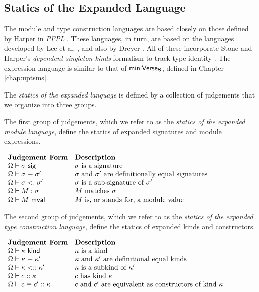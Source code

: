 \subsection{Statics of the Expanded Language}
The module and type construction languages are based closely on those defined by Harper in \emph{PFPL} \cite{pfpl}. These languages, in turn, are based on the languages developed by Lee et al. \cite{conf/popl/LeeCH07}, and also by Dreyer \cite{dreyer2005understanding}. All of these incorporate Stone and Harper's \emph{dependent singleton kinds} formalism to track type identity \cite{stone2006extensional}. The expression language is similar to that of $\mathsf{miniVerse}_\textbf{S}$, defined in Chapter \ref{chap:uptsms}.

The \emph{statics of the expanded language} is defined by a collection of judgements that we organize into three groups. 

The first group of judgements, which we refer to as the \emph{statics of the expanded module language}, define the statics of expanded signatures and module expressions.

\vspace{5px}
$\begin{array}{ll}
\textbf{Judgement Form} & \textbf{Description}\\
\Omega \vdash \sigma~\mathsf{sig} & \text{$\sigma$ is a signature }\\
\Omega \vdash \sigma \equiv \sigma' & \text{$\sigma$ and $\sigma'$ are definitionally equal signatures}\\
\Omega \vdash \sigma <: \sigma' & \text{$\sigma$ is a sub-signature of $\sigma'$}\\
\Omega \vdash M : \sigma & \text{$M$ matches $\sigma$}\\
\Omega \vdash M~\mathsf{mval} & \text{$M$ is, or stands for, a module value}
\end{array}$
\vspace{5px}

The second group of judgements, which we refer to as the \emph{statics of the expanded type construction language}, define the statics of expanded kinds and constructors.

\vspace{5px}
$\begin{array}{ll}
\textbf{Judgement Form} & \textbf{Description}\\
\Omega \vdash \kappa~\mathsf{kind} & \text{$\kappa$ is a kind}\\
\Omega \vdash \kappa \equiv \kappa' & \text{$\kappa$ and $\kappa'$ are definitional equal kinds}\\
\Omega \vdash \kappa <:: \kappa' & \text{$\kappa$ is a subkind of $\kappa'$}\\
\Omega \vdash c :: \kappa & \text{$c$ has kind $\kappa$}\\
\Omega \vdash c \equiv c' :: \kappa & \text{$c$ and $c'$ are equivalent as constructors of kind $\kappa$}
\end{array}$
\vspace{5px}


